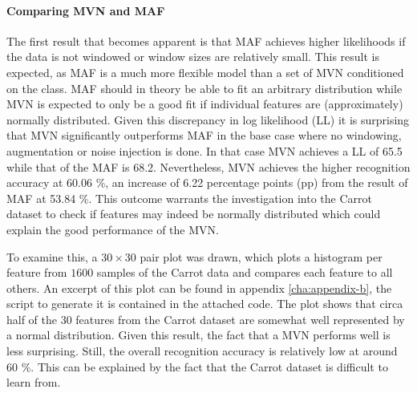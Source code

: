 \documentclass[11pt,titlepage,oneside,openany]{book}
\begin{document}
\paragraph{Comparing MVN and MAF}
\noindent The first result that becomes apparent is that MAF achieves higher likelihoods if the data is not windowed or window sizes are relatively small. This result is expected, as MAF is a much more flexible model than a set of MVN conditioned on the class. MAF should in theory be able to fit an arbitrary distribution while MVN is expected to only be a good fit if individual features are (approximately) normally distributed. Given this discrepancy in log likelihood (LL) it is surprising that MVN significantly outperforms MAF in the base case where no windowing, augmentation or noise injection is done. In that case MVN achieves a LL of 65.5 while that of the MAF is 68.2. Nevertheless, MVN achieves the higher recognition accuracy at 60.06 \%, an increase of 6.22 percentage points (pp) from the result of MAF at 53.84 \%. This outcome warrants the investigation into the Carrot dataset to check if features may indeed be normally distributed which could explain the good performance of the MVN.

To examine this, a $30 \times 30$ pair plot was drawn, which plots a histogram per feature from $1600$ samples of the Carrot data and compares each feature to all others. An excerpt of this plot can be found in appendix \ref{cha:appendix-b}, the script to generate it is contained in the attached code. The plot shows that circa half of the 30 features from the Carrot dataset are somewhat well represented by a normal distribution. Given this result, the fact that a MVN performs well is less surprising. Still, the overall recognition accuracy is relatively low at around 60 \%. This can be explained by the fact that the Carrot dataset is difficult to learn from.
\end{document}
